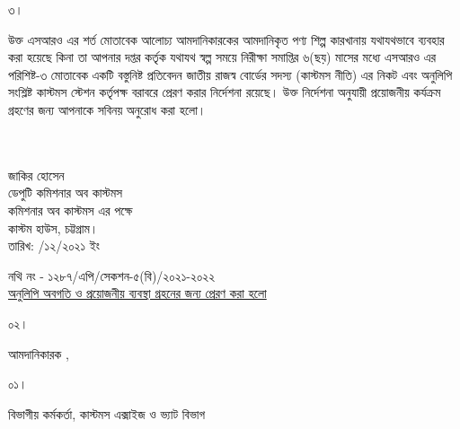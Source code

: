\documentclass[12pt]{article}
\newcommand{\fileno}{নথি নং - ১২৮৭/এপি/সেকশন-৫(বি)/২০২১-২০২২}
\newcommand{\impn}{\jdwl}
\newcommand{\impadd}{\jdwla}
\newcommand{\rodt}{তারিখ: \hspace{2.0em}/১২/২০২১ ইং}
\begin{document}
\begin{minipage}[t]{.07\linewidth}
৩।
\end{minipage}
\begin{minipage}[t]{.93\linewidth}
উক্ত এসআরও এর শর্ত মোতাবেক
আলোচ্য আমদানিকারকের আমদানিকৃত পণ্য
শিল্প কারখানায় যথাযথভাবে ব্যবহার করা হয়েছে
কিনা তা আপনার দপ্তর কর্তৃক
যথাযথ স্বল্প সময়ে
নিরীক্ষা সমাপ্তির ৬(ছয়) মাসের মধ্যে এসআরও
এর পরিশিষ্ট-৩ মোতাবেক একটি বস্তুনিষ্ট
প্রতিবেদন জাতীয় রাজস্ব বোর্ডের সদস্য
(কাস্টমস নীতি) এর নিকট এবং অনুলিপি সংশ্লিষ্ট
কাস্টমস স্টেশন কর্তৃপক্ষ বরাবরে প্রেরণ করার
নির্দেশনা রয়েছে। উক্ত নির্দেশনা
অনুযায়ী প্রয়োজনীয় কর্যক্রম গ্রহণের জন্য
আপনাকে সবিনয় অনুরোধ করা হলো।
\\
\\
\\
\end{minipage}
\begin{minipage}[t]{0.60\linewidth}
\hspace{1em}
\end{minipage}
\begin{minipage}[t]{0.40\linewidth}
\begin{center}
জাকির হোসেন
\\
ডেপুটি কমিশনার অব কাস্টমস
\\
কমিশনার অব কাস্টমস এর পক্ষে
\\
কাস্টম হাউস, চট্টগ্রাম।
\\
\footnotesize{{\rodt}}
\vspace*{10MM}
\end{center}
\end{minipage}
\footnotesize{{\fileno}}
\\
\underline{\footnotesize{অনুলিপি অবগতি ও প্রয়োজনীয় ব্যবস্থা গ্রহনের জন্য প্রেরণ করা হলো}}
\\
\begin{minipage}[t]{0.06\linewidth}
\footnotesize{০২।}
\end{minipage}
\begin{minipage}[t]{0.94\linewidth}
\footnotesize{
আমদানিকারক {\impn}, {\impadd}
}
\end{minipage}
\begin{minipage}[t]{0.06\linewidth}
\footnotesize{০১।}
\end{minipage}
\begin{minipage}[t]{0.94\linewidth}
বিভাগীয় কর্মকর্তা, কাস্টমস এক্সাইজ ও ভ্যাট বিভাগ
\end{minipage}
\end{document}
